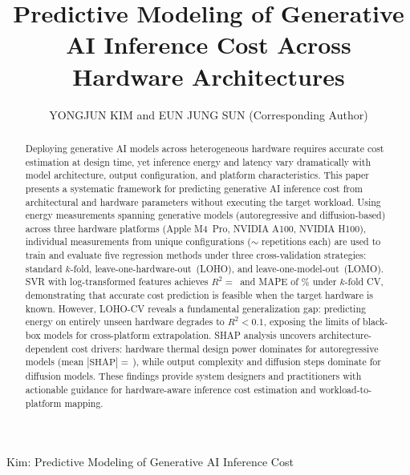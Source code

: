 \documentclass{ieeeaccess}
\begin{document}
\title{Predictive Modeling of Generative AI Inference Cost Across Hardware Architectures}

\author{\uppercase{Yongjun Kim} and \uppercase{Eun Jung Sun} (Corresponding Author)}
\address[1]{Department of Software, Ajou University, Suwon 16499, Republic of Korea (e-mail: yjkim0123@ajou.ac.kr; ORCID: 0000-0003-4234-4883)}
\address[2]{Department of Accounting, Hannam University, Daejeon 34430, Republic of Korea (e-mail: belle@hnu.kr)}

%
{Kim: Predictive Modeling of Generative AI Inference Cost}

\begin{abstract}
Deploying generative AI models across heterogeneous hardware requires accurate cost estimation at design time, yet inference energy and latency vary dramatically with model architecture, output configuration, and platform characteristics.
This paper presents a systematic framework for predicting generative AI inference cost from architectural and hardware parameters without executing the target workload.
Using \unskip{} energy measurements spanning \unskip{} generative models (autoregressive and diffusion-based) across three hardware platforms (Apple M4~Pro, NVIDIA A100, NVIDIA H100), individual measurements from \unskip{} unique configurations (${\sim}$\unskip{} repetitions each) are used to train and evaluate five regression methods under three cross-validation strategies: standard $k$-fold, leave-one-hardware-out~(LOHO), and leave-one-model-out~(LOMO).
SVR with log-transformed features achieves $R^2 {=}$\,\unskip{} and MAPE of \unskip\% under $k$-fold CV, demonstrating that accurate cost prediction is feasible when the target hardware is known.
However, LOHO-CV reveals a fundamental generalization gap: predicting energy on entirely unseen hardware degrades to $R^2 {<} 0.1$, exposing the limits of black-box models for cross-platform extrapolation.
SHAP analysis uncovers architecture-dependent cost drivers: hardware thermal design power dominates for autoregressive models (mean $|\text{SHAP}| {=}$\,\unskip), while output complexity and diffusion steps dominate for diffusion models.
These findings provide system designers and practitioners with actionable guidance for hardware-aware inference cost estimation and workload-to-platform mapping.
\end{abstract}
\end{document}
